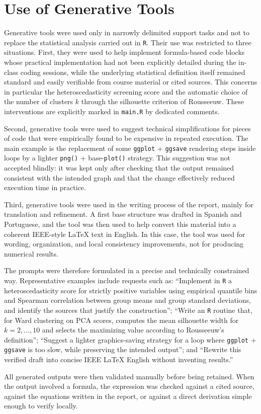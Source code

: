 \section{Use of Generative Tools}
Generative tools were used only in narrowly delimited support tasks and not to replace the statistical analysis carried out in \texttt{R}. Their use was restricted to three situations. First, they were used to help implement formula-based code blocks whose practical implementation had not been explicitly detailed during the in-class coding sessions, while the underlying statistical definition itself remained standard and easily verifiable from course material or cited sources. This concerns in particular the heteroscedasticity screening score and the automatic choice of the number of clusters \(k\) through the silhouette criterion of Rousseeuw. These interventions are explicitly marked in \texttt{main.R} by dedicated comments.

Second, generative tools were used to suggest technical simplifications for pieces of code that were empirically found to be expensive in repeated execution. The main example is the replacement of some \texttt{ggplot} + \texttt{ggsave} rendering steps inside loops by a lighter \texttt{png()} + base-\texttt{plot()} strategy. This suggestion was not accepted blindly: it was kept only after checking that the output remained consistent with the intended graph and that the change effectively reduced execution time in practice.

Third, generative tools were used in the writing process of the report, mainly for translation and refinement. A first base structure was drafted in Spanish and Portuguese, and the tool was then used to help convert this material into a coherent IEEE-style LaTeX text in English. In this case, the tool was used for wording, organization, and local consistency improvements, not for producing numerical results.

The prompts were therefore formulated in a precise and technically constrained way. Representative examples include requests such as: ``Implement in \texttt{R} a heteroscedasticity score for strictly positive variables using empirical quantile bins and Spearman correlation between group means and group standard deviations, and identify the sources that justify the construction''; ``Write an \texttt{R} routine that, for Ward clustering on PCA scores, computes the mean silhouette width for \(k=2,\dots,10\) and selects the maximizing value according to Rousseeuw's definition''; ``Suggest a lighter graphics-saving strategy for a loop where \texttt{ggplot} + \texttt{ggsave} is too slow, while preserving the intended output''; and ``Rewrite this verified draft into concise IEEE LaTeX English without inventing results.''

All generated outputs were then validated manually before being retained. When the output involved a formula, the expression was checked against a cited source, against the equations written in the report, or against a direct derivation simple enough to verify locally.